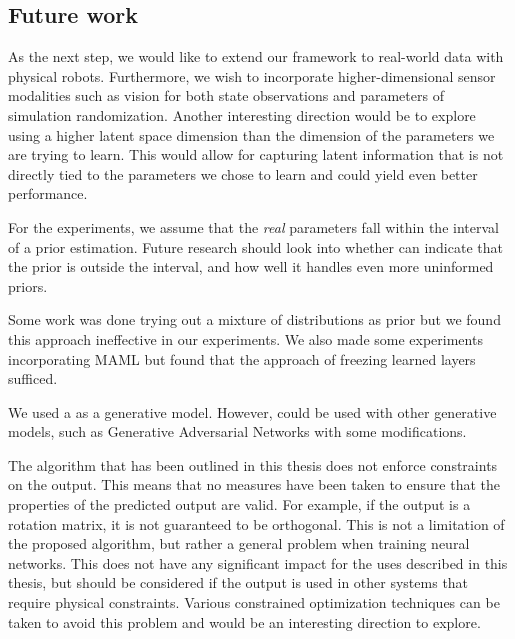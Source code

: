
\subsection{Future work}
As the next step, we would like to extend our framework to real-world data with physical robots. Furthermore, we wish to incorporate higher-dimensional sensor modalities such as vision for both state observations and parameters of simulation randomization.
Another interesting direction would be to explore using a higher latent space dimension than the dimension of the parameters we are trying to learn. This would allow for capturing latent information that is not directly tied to the parameters we chose to learn and could yield even better performance.

For the experiments, we assume that the \textit{real} parameters fall within the interval of a prior estimation. Future research should look into whether \dettostoc{} can indicate that the prior is outside the interval, and how well it handles even more uninformed priors.

Some work was done trying out a mixture of distributions as prior \parencite{DBLP:journals/corr/DilokthanakulMG16} but we found this approach ineffective in our experiments. We also made some experiments incorporating MAML but found that the approach of freezing learned layers sufficed.

We used a \cvae{} as a generative model. However, \dettostoc{} could be used with other generative models, such as Generative Adversarial Networks \parencite{goodfellow2014} with some modifications.

The \dettostoc{} algorithm that has been outlined in this thesis does not enforce constraints on the output. This means that no measures have been taken to ensure that the properties of the predicted output are valid. For example, if the output is a rotation matrix, it is not guaranteed to be orthogonal. This is not a limitation of the proposed \dettostoc{} algorithm, but rather a general problem when training neural networks. This does not have any significant impact for the uses described in this thesis, but should be considered if the output is used in other systems that require physical constraints. Various constrained optimization techniques can be taken to avoid this problem and would be an interesting direction to explore. %